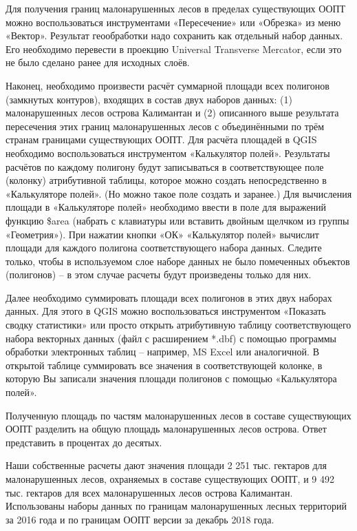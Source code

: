 Для получения границ малонарушенных лесов в пределах существующих ООПТ можно воспользоваться инструментами «Пересечение» или «Обрезка» из меню «Вектор». Результат геообработки надо сохранить как отдельный набор данных. Его необходимо перевести в проекцию Universal Transverse Mercator, если это не было сделано ранее для исходных слоёв.

Наконец, необходимо произвести расчёт суммарной площади всех полигонов (замкнутых контуров), входящих в состав двух наборов данных: (1) малонарушенных лесов острова Калимантан и (2) описанного выше результата пересечения этих границ малонарушенных лесов с объединёнными по трём странам границами существующих ООПТ. Для расчёта площадей в QGIS необходимо воспользоваться инструментом «Калькулятор полей». Результаты расчётов по каждому полигону будут записываться в соответствующее поле (колонку) атрибутивной таблицы, которое можно создать непосредственно в «Калькуляторе полей». (Но можно такое поле создать и заранее.) Для вычисления площади в «Калькуляторе полей» необходимо ввести в поле для выражений функцию \$area (набрать с клавиатуры или вставить двойным щелчком из группы «Геометрия»). При нажатии кнопки «ОК» «Калькулятор полей» вычислит площади для каждого полигона соответствующего набора данных. Следите только, чтобы в используемом слое наборе данных не было помеченных объектов (полигонов) – в этом случае расчеты будут произведены только для них.

Далее необходимо суммировать площади всех полигонов в этих двух наборах данных. Для этого в QGIS можно воспользоваться инструментом «Показать сводку статистики» или просто открыть атрибутивную таблицу соответствующего набора векторных данных (файл с расширением *.dbf) с помощью программы обработки электронных таблиц – например, MS Excel или аналогичной. В открытой таблице суммировать все значения в соответствующей колонке, в которую Вы записали значения площади полигонов с помощью «Калькулятора полей».

Полученную площадь по частям малонарушенных лесов в составе существующих ООПТ разделить на общую площадь малонарушенных лесов острова. Ответ представить в процентах до десятых.

Наши собственные расчеты дают значения площади 2 251 тыс. гектаров для малонарушенных лесов, охраняемых в составе существующих ООПТ, и 9 492 тыс. гектаров для всех малонарушенных лесов острова Калимантан. Использованы наборы данных по границам малонарушенных лесных территорий за 2016 года и по границам ООПТ версии за декабрь 2018 года.

